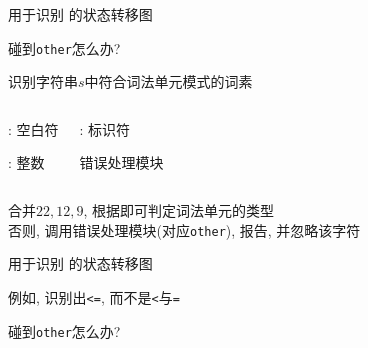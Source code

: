 \begin{frame}{}
  \begin{center}
    用于识别 \blue{\intnum} 的状态转移图

    \pause
    \vspace{0.40cm}
     碰到\texttt{other}怎么办?
  \end{center}
\end{frame}

\begin{frame}{}
  \begin{center}
    识别字符串$s$中符合词法单元模式的词素
  \end{center}

  \begin{columns}
      \begin{center}
        \ws: 空白符

        \vspace{0.20cm}
        \intnum: 整数
      \end{center}
      \begin{center}
        \id: 标识符

        \vspace{0.40cm}
        错误处理模块
      \end{center}
  \end{columns}

  \pause
  \vspace{0.30cm}
  \begin{center}
     合并$22, 12, 9$, 根据即可判定词法单元的类型 \\[8pt]
    否则, 调用错误处理模块(对应\texttt{other}), 报告, 并忽略该字符
  \end{center}
\end{frame}

\begin{frame}{}
  \begin{center}
    用于识别 \blue{\relop} 的状态转移图

    \pause
    \vspace{0.30cm}
     例如, 识别出\texttt{<=}, 而不是\texttt{<}与\texttt{=}

    \pause
    \vspace{0.30cm}
     碰到\texttt{other}怎么办?
  \end{center}
\end{frame}

